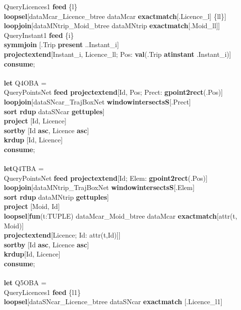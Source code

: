 \documentclass[a4paper]{article}
\newcommand{\op}[1]{\textbf{#1}}
\begin{document}
\begin{scriptsize}
\begin{tabbing}
\>QueryLicences1 \op{feed} \{l\}\\
\>\>\op{loopsel}[dataMcar\_Licence\_btree dataMcar \op{exactmatch}[.Licence\_l] \{ll\}]\\
\>\>\op{loopjoin}[dataMNtrip\_Moid\_btree dataMNtrip
\op{exactmatch}[.Moid\_ll]]\\
\>QueryInstant1 \op{feed} \{i\}\\
\>\op{symmjoin} [.Trip \op{present} ..Instant\_i]\\
\>\op{projectextend}[Instant\_i, Licence\_ll; Pos: \op{val}(.Trip
\op{atinstant} .Instant\_i)]\\
\op{consume};\\
\\
\op{let} Q4OBA =\\
\> QueryPointsNet \op{feed projectextend}[Id, Pos; Prect: \op{gpoint2rect}(.Pos)]\\
\>\op{loopjoin}[dataSNcar\_TrajBoxNet \op{windowintersectsS}[.Prect]\\
\>\>\>\op{sort rdup} dataSNcar \op{gettuples}]\\
\>\op{project} [Id, Licence]\\
\>\op{sortby} [Id \op{asc}, Licence \op{asc}]\\
\>\op{krdup} [Id, Licence]\\
\op{consume};\\
\\
\op{let}Q4TBA =\\
\>QueryPointsNet \op{feed projectextend}[Id; Elem: \op{gpoint2rect}(.Pos)]\\
\>\op{loopjoin}[dataMNtrip\_TrajBoxNet \op{windowintersectsS}[.Elem]\\
\>\>\>\op{sort rdup} dataMNtrip \op{gettuples}]\\
\>\op{project} [Moid, Id]\\
\>\op{loopsel}[\op{fun}(t:TUPLE) dataMcar\_Moid\_btree dataMcar \op{exactmatch}[attr(t, Moid)]\\
\>\>\op{projectextend}[Licence; Id: attr(t,Id)]]\\
\>\op{sortby} [Id \op{asc}, Licence \op{asc}]\\
\>\op{krdup}[Id, Licence]\\
\op{consume};\\
\\
\op{let} Q5OBA = \\
\>QueryLicences1 \op{feed} \{l1\}\\
\>\>\op{loopsel}[dataSNcar\_Licence\_btree dataSNcar \op{exactmatch} [.Licence\_l1]\\

\end{tabbing}
\end{scriptsize}
\end{document}
